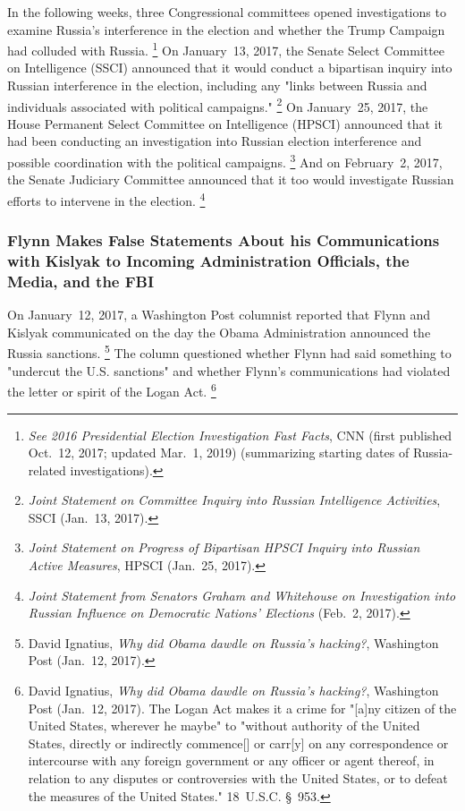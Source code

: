 In the following weeks, three Congressional committees opened investigations to examine Russia's interference in the election and whether the Trump Campaign had colluded with Russia.%
\footnote{\textit{See 2016 Presidential Election Investigation Fast Facts}, CNN (first published Oct.~12, 2017;
updated Mar.~1, 2019) (summarizing starting dates of Russia-related investigations).}
On January~13, 2017, the Senate Select Committee on Intelligence (SSCI) announced that it would conduct a bipartisan inquiry into Russian interference in the election, including any "links between Russia and individuals associated with political campaigns."%
\footnote{\textit{Joint Statement on Committee Inquiry into Russian Intelligence Activities}, SSCI (Jan.~13, 2017).}
On January~25, 2017, the House Permanent Select Committee on Intelligence (HPSCI) announced that it had been conducting an investigation into Russian election interference and possible coordination with the political campaigns.%
\footnote{\textit{Joint Statement on Progress of Bipartisan HPSCI Inquiry into Russian Active Measures}, HPSCI (Jan.~25, 2017).}
And on February~2, 2017, the Senate Judiciary Committee announced that it too would investigate Russian efforts to intervene in the election.%
\footnote{\textit{Joint Statement from Senators Graham and Whitehouse on Investigation into Russian Influence on Democratic Nations' Elections} (Feb.~2, 2017).}

\subsubsection{Flynn Makes False Statements About his Communications with Kislyak to Incoming Administration Officials, the Media, and the FBI}

On January~12, 2017, a Washington Post columnist reported that Flynn and Kislyak communicated on the day the Obama Administration announced the Russia sanctions.%
\footnote{David Ignatius, \textit{Why did Obama dawdle on Russia's hacking?}, Washington Post (Jan.~12, 2017).}
The column questioned whether Flynn had said something to "undercut the U.S. sanctions" and whether Flynn's communications had violated the letter or spirit of the Logan Act.%
\footnote{David Ignatius, \textit{Why did Obama dawdle on Russia's hacking?}, Washington Post (Jan.~12, 2017).
The Logan Act makes it a crime for "[a]ny citizen of the United States, wherever he maybe" to "without authority of the United States, directly or indirectly commence[] or carr[y] on any correspondence or intercourse with any foreign government or any officer or agent thereof, in relation to any disputes or controversies with the United States, or to defeat the measures of the United States." 18~U.S.C. \S~953.}

